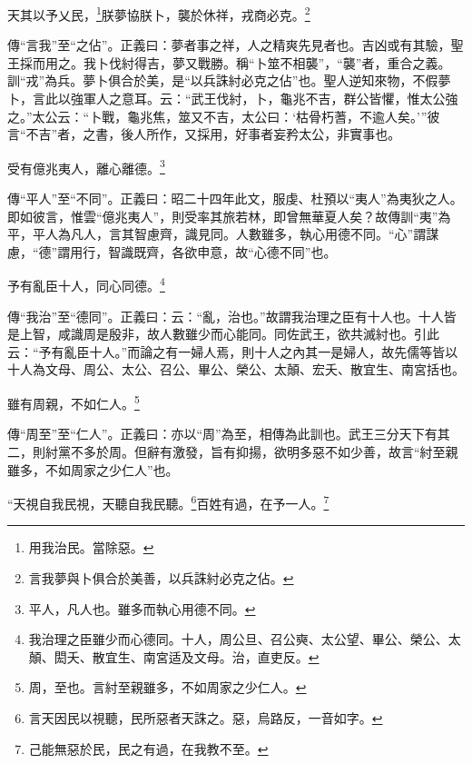 天其以予乂民，\footnote{用我治民。當除惡。}朕夢協朕卜，襲於休祥，戎商必克。\footnote{言我夢與卜俱合於美善，以兵誅紂必克之佔。}

{\noindent\zhuan{}\fzbyks 傳“言我”至“之佔”。正義曰：夢者事之祥，人之精爽先見者也。吉凶或有其驗，聖王採而用之。我卜伐紂得吉，夢又戰勝。稱“卜筮不相襲”，“襲”者，重合之義。訓“戎”為兵。夢卜俱合於美，是“以兵誅紂必克之佔”也。聖人逆知來物，不假夢卜，言此以強軍人之意耳。云：“武王伐紂，卜，龜兆不吉，群公皆懼，惟太公強之。”太公云：“卜戰，龜兆焦，筮又不吉，太公曰：‘枯骨朽蓍，不逾人矣。’”彼言“不吉”者，之書，後人所作，又採用，好事者妄矜太公，非實事也。 \par}

受有億兆夷人，離心離德。\footnote{平人，凡人也。雖多而執心用德不同。}

{\noindent\zhuan{}\fzbyks 傳“平人”至“不同”。正義曰：昭二十四年此文，服虔、杜預以“夷人”為夷狄之人。即如彼言，惟雲“億兆夷人”，則受率其旅若林，即曾無華夏人矣？故傳訓“夷”為平，平人為凡人，言其智慮齊，識見同。人數雖多，執心用德不同。“心”謂謀慮，“德”謂用行，智識既齊，各欲申意，故“心德不同”也。 \par}

予有亂臣十人，同心同德。\footnote{我治理之臣雖少而心德同。十人，周公旦、召公奭、太公望、畢公、榮公、太顛、閎夭、散宜生、南宮适及文母。治，直吏反。}

{\noindent\zhuan{}\fzbyks 傳“我治”至“德同”。正義曰：云：“亂，治也。”故謂我治理之臣有十人也。十人皆是上智，咸識周是殷非，故人數雖少而心能同。同佐武王，欲共滅紂也。引此云：“予有亂臣十人。”而論之有一婦人焉，則十人之內其一是婦人，故先儒等皆以十人為文母、周公、太公、召公、畢公、榮公、太顛、宏夭、散宜生、南宮括也。 \par}

雖有周親，不如仁人。\footnote{周，至也。言紂至親雖多，不如周家之少仁人。}

{\noindent\zhuan{}\fzbyks 傳“周至”至“仁人”。正義曰：亦以“周”為至，相傳為此訓也。武王三分天下有其二，則紂黨不多於周。但辭有激發，旨有抑揚，欲明多惡不如少善，故言“紂至親雖多，不如周家之少仁人”也。 \par}

“天視自我民視，天聽自我民聽。\footnote{言天因民以視聽，民所惡者天誅之。惡，烏路反，一音如字。}百姓有過，在予一人。\footnote{己能無惡於民，民之有過，在我教不至。}

